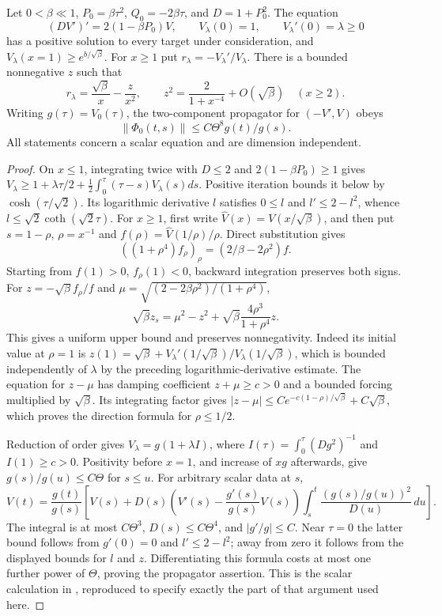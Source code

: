 \begin{lemma}\label{lem:scalar-growth}
Let $0<\beta\ll1$, $P_0=\beta\tau^2$, $Q_0=-2\beta\tau$, and
$D=1+P_0^2$. The equation
\[
 (DV')'=2(1-\beta P_0)V,\qquad V_\lambda(0)=1,
 \qquad V_\lambda'(0)=\lambda\geq0
\]
has a positive solution to every target under consideration, and
$V_\lambda(x=1)\geq e^{b/\sqrt\beta}$. For $x\geq1$ put
$r_\lambda=-V_\lambda'/V_\lambda$. There is a bounded nonnegative $z$
such that
\[
 r_\lambda=\frac{\sqrt\beta}{x}-\frac z{x^2},\qquad
 z^2=\frac2{1+x^{-4}}+O(\sqrt\beta)\quad(x\geq2).
\]
Writing $g(\tau)=V_0(\tau)$, the two-component propagator for
$(-V',V)$ obeys
\[ \|\Phi_0(t,s)\|\leq C\Theta^8g(t)/g(s). \]
All statements concern a scalar equation and are dimension independent.
\end{lemma}
\begin{proof}
On $x\leq1$, integrating twice with $D\leq2$ and
$2(1-\beta P_0)\geq1$ gives
$V_\lambda\geq1+\lambda\tau/2+\tfrac12\int_0^\tau(\tau-s)V_\lambda(s)ds$.
Positive iteration bounds it below by $\cosh(\tau/\sqrt2)$.
Its logarithmic derivative $l$ satisfies $0\leq l$ and
$l'\leq2-l^2$, whence $l\leq\sqrt2\coth(\sqrt2\tau)$.
For $x\geq1$, first write $\widehat V(x)=V(x/\sqrt\beta)$,
and then put $s=1-\rho$, $\rho=x^{-1}$ and
$f(\rho)=\widehat V(1/\rho)/\rho$. Direct substitution gives
\[
 ((1+\rho^4)f_\rho)_\rho=(2/\beta-2\rho^2)f.
\]
Starting from $f(1)>0$, $f_\rho(1)<0$, backward integration preserves
both signs. For $z=-\sqrt\beta f_\rho/f$ and
$\mu=\sqrt{(2-2\beta\rho^2)/(1+\rho^4)}$,
\[
 \sqrt\beta z_s=\mu^2-z^2+
               \sqrt\beta\frac{4\rho^3}{1+\rho^4}z.
\]
This gives a uniform upper bound and preserves nonnegativity.
Indeed its initial value at $\rho=1$ is
$z(1)=\sqrt\beta+V_\lambda'(1/\sqrt\beta)/V_\lambda(1/\sqrt\beta)$,
which is bounded independently of $\lambda$ by the preceding
logarithmic-derivative estimate.
The equation for $z-\mu$ has damping coefficient $z+\mu\geq c>0$
and a bounded forcing multiplied by $\sqrt\beta$. Its integrating
factor gives $|z-\mu|\leq Ce^{-c(1-\rho)/\sqrt\beta}+C\sqrt\beta$,
which proves the direction formula for $\rho\leq1/2$.

Reduction of order gives
$V_\lambda=g(1+\lambda I)$, where $I(\tau)=\int_0^\tau(Dg^2)^{-1}$
and $I(1)\geq c>0$. Positivity before $x=1$, and increase of $xg$
afterwards, give $g(s)/g(u)\leq C\Theta$ for $s\leq u$.
For arbitrary scalar data at $s$,
\[
 V(t)=\frac{g(t)}{g(s)}\left[
 V(s)+D(s)\left(V'(s)-\frac{g'(s)}{g(s)}V(s)\right)
 \int_s^t\frac{(g(s)/g(u))^2}{D(u)}\,du\right].
\]
The integral is at most $C\Theta^3$, $D(s)\leq C\Theta^4$, and
$|g'/g|\leq C$. Near $\tau=0$ the latter bound follows from
$g'(0)=0$ and $l'\leq2-l^2$; away from zero it follows from the
displayed bounds for $l$ and $z$.
Differentiating this formula costs at most one further
power of $\Theta$, proving the propagator assertion. This is the scalar
calculation in \cite[\S\S4.4--4.5]{OAI}, reproduced to specify exactly the
part of that argument used here.
\end{proof}

